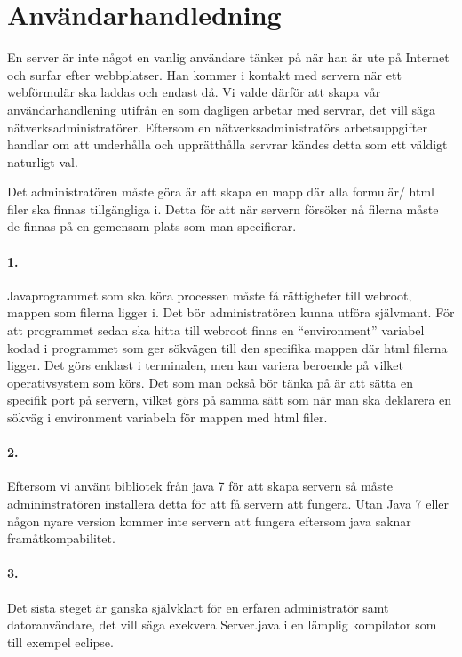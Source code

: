 \section{Användarhandledning}
En server är inte något en vanlig användare tänker på när han är ute på Internet och surfar efter webbplatser. Han kommer i kontakt med servern när ett webförmulär ska laddas och endast då.
Vi valde därför att skapa vår användarhandlening utifrån en som dagligen arbetar med servrar, det vill säga nätverksadministratörer. 
Eftersom en nätverksadministratörs arbetsuppgifter handlar om att underhålla och upprätthålla servrar kändes detta som ett väldigt naturligt val.

Det administratören måste göra är att skapa en mapp där alla formulär/ html filer ska finnas tillgängliga i. Detta för att när servern försöker nå filerna måste de finnas på en gemensam plats som man specifierar.


\paragraph{1.}
Javaprogrammet som ska köra processen måste få rättigheter till webroot, mappen som filerna ligger i. Det bör administratören kunna utföra självmant. För att programmet sedan ska hitta till webroot finns en “environment” variabel kodad i programmet som ger sökvägen till den specifika mappen där html filerna ligger. Det görs enklast i terminalen, men kan variera beroende på vilket operativsystem som körs.
Det som man också bör tänka på är att sätta en specifik port på servern, vilket görs på samma sätt som när man ska deklarera en sökväg i environment variabeln för mappen med html filer.



\paragraph{2.}
Eftersom vi använt bibliotek från java 7 för att skapa servern så måste admininstratören installera detta för att få servern att fungera. Utan Java 7 eller någon nyare version kommer inte servern att fungera eftersom java saknar framåtkompabilitet. 


\paragraph{3.}
Det sista steget är ganska självklart för en erfaren administratör samt datoranvändare, det vill säga exekvera Server.java i en lämplig kompilator som till exempel eclipse. 
